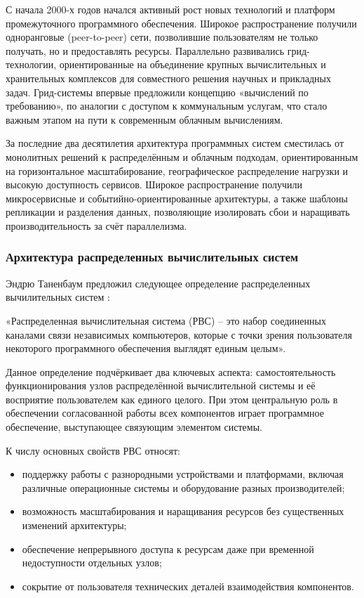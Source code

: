 С начала 2000-х годов начался активный рост новых технологий и платформ
промежуточного программного обеспечения. Широкое распространение получили
одноранговые (peer-to-peer) сети, позволившие пользователям не только получать,
но и предоставлять ресурсы. Параллельно развивались грид-технологии,
ориентированные на объединение крупных вычислительных и хранительных комплексов
для совместного решения научных и прикладных задач. Грид-системы впервые
предложили концепцию «вычислений по требованию», по аналогии с доступом к
коммунальным услугам, что стало важным этапом на пути к современным облачным
вычислениям.

За последние два десятилетия архитектура программных систем сместилась от
монолитных решений к распределённым и облачным подходам, ориентированным на
горизонтальное масштабирование, географическое распределение нагрузки и высокую
доступность сервисов. Широкое распространение получили микросервисные и
событийно-ориентированные архитектуры, а также шаблоны репликации и разделения
данных, позволяющие изолировать сбои и наращивать производительность за счёт
параллелизма.

\subsubsection{Архитектура распределенных вычислительных систем}

Эндрю Таненбаум предложил следующее определение распределенных вычилительных
систем \cite{tanenbaum_distributed_systems}:

«Распределенная вычислительная система (РВС) – это набор соединенных каналами
связи независимых компьютеров, которые с точки зрения пользователя некоторого
программного обеспечения выглядят единым целым».

Данное определение подчёркивает два ключевых аспекта: самостоятельность
функционирования узлов распределённой вычислительной системы и её восприятие
пользователем как единого целого. При этом центральную роль в обеспечении
согласованной работы всех компонентов играет программное обеспечение,
выступающее связующим элементом системы.

К числу основных свойств РВС относят:
\begin{itemize}
    \item поддержку работы с разнородными устройствами и платформами, включая
        различные операционные системы и оборудование разных производителей;
    \item возможность масштабирования и наращивания ресурсов без существенных
        изменений архитектуры;
    \item обеспечение непрерывного доступа к ресурсам даже при временной
        недоступности отдельных узлов;
    \item сокрытие от пользователя технических деталей взаимодействия
        компонентов.
\end{itemize}

